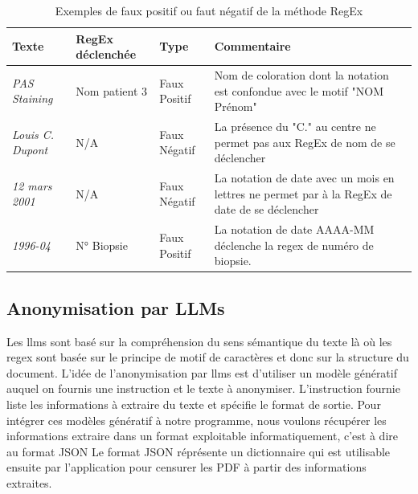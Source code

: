 \begin{table}[ht]
\centering
\caption{Exemples de faux positif ou faut négatif de la méthode RegEx}
\label{tab:regex_fail}
\begin{tabularx}{\textwidth}{|X|X|X|X|}
\hline
\textbf{Texte} & \textbf{RegEx déclenchée} & \textbf{Type} & \textbf{Commentaire} \\ \hline
\textit{PAS Staining} & Nom patient 3 & Faux Positif & Nom de coloration dont la notation est confondue avec le motif "NOM Prénom" \\ \hline
\textit{Louis C. Dupont} & N/A & Faux Négatif & La présence du "C." au centre ne permet pas aux RegEx de nom de se déclencher \\ \hline
\textit{12 mars 2001} & N/A & Faux Négatif & La notation de date avec un mois en lettres ne permet par à la RegEx de date de se déclencher \\ \hline
\textit{1996-04} & N° Biopsie & Faux Positif & La notation de date AAAA-MM déclenche la \gls{regex} de numéro de biopsie. \\ \hline
\end{tabularx}
\end{table}

\subsection{Anonymisation par LLMs}
Les \gls{llms} sont basé sur la compréhension du sens sémantique du texte là où les \gls{regex} sont basée sur le principe de motif de caractères et donc sur la structure du document. L'idée de l'anonymisation par \gls{llms} est d'utiliser un modèle génératif auquel on fournis une instruction et le texte à anonymiser. L'instruction fournie liste les informations à extraire du texte et spécifie le format de sortie. Pour intégrer ces modèles génératif à notre programme, nous voulons récupérer les informations extraire dans un format exploitable informatiquement, c'est à dire au format JSON Le format JSON réprésente un dictionnaire qui est utilisable ensuite par l'application pour censurer les PDF à partir des informations extraites.
